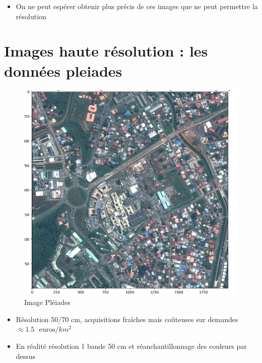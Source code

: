 \documentclass[
  letterpaper,
  DIV=11,
  numbers=noendperiod]{scrreprt}
\providecommand{\tightlist}{%
  \setlength{\itemsep}{0pt}\setlength{\parskip}{0pt}}\usepackage{longtable,booktabs,array}
\begin{document}
\begin{itemize}
\tightlist
\item
  On ne peut espérer obtenir plus précis de ces images que ne peut
  permettre la résolution
\end{itemize}

\hypertarget{images-haute-ruxe9solution-les-donnuxe9es-pleiades}{%
\section{Images haute résolution : les données
pleiades}\label{images-haute-ruxe9solution-les-donnuxe9es-pleiades}}

\begin{figure}[H]

{\centering \includegraphics{figures/pleiade.png}

}

\caption{\label{fig-im-pleiade}Image Pléiades}

\end{figure}

\begin{itemize}
\tightlist
\item
  Résolution 50/70 cm, acquisitions fraîches mais coûteuses sur demandes
  \(\approx 1.5 \text{~~euros}/ km^{2}\)
\item
  En réalité résolution 1 bande 50 cm et réanchantillonnage des couleurs
  par dessus
\end{itemize}
\end{document}
